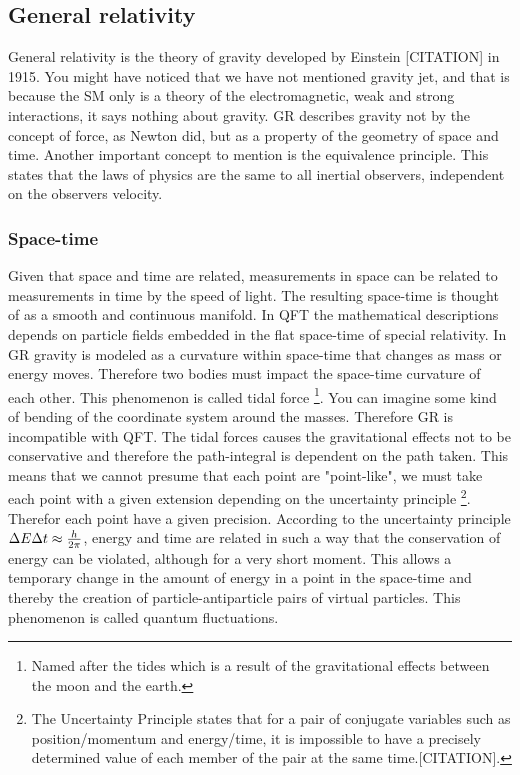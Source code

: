 \subsection{General relativity}
General relativity is the theory of gravity developed by Einstein [CITATION] in 1915. You might have noticed that we have not mentioned gravity jet, and that is because the SM only is a theory of the electromagnetic, weak and strong interactions, it says nothing about gravity. GR describes gravity not by the concept of force, as Newton did, but as a property of the geometry of space and time. Another important concept to mention is the equivalence principle. This states that the laws of physics are the same to all inertial observers, independent on the observers velocity.

\subsubsection{Space-time}
Given that space and time are related, measurements in space can be related to measurements in time by the speed of light. The resulting space-time is thought of as a smooth and continuous manifold. In QFT the mathematical descriptions depends on particle fields embedded in the flat space-time of special relativity. In GR gravity is modeled as a curvature within space-time that changes as mass or energy moves. Therefore two bodies must impact the space-time curvature of each other. This phenomenon is called tidal force \footnote{Named after the tides which is a result of the gravitational effects between the moon and the earth.}. You can imagine some kind of bending of the coordinate system around the masses. Therefore GR is incompatible with QFT. The tidal forces causes the gravitational effects not to be conservative and therefore the path-integral is dependent on the path taken. This means that we cannot presume that each point are "point-like", we must take each point with a given extension depending on the uncertainty principle \footnote{The Uncertainty Principle states that for a pair of conjugate variables such as position/momentum and energy/time, it is impossible to have a precisely determined value of each member of the pair at the same time.[CITATION].}. Therefor each point have a given precision. According to the uncertainty principle $\Delta E \Delta t \approx {h \over 2 \pi}$, energy and time are related in such a way that the conservation of energy can be violated, although for a very short moment. This allows a temporary change in the amount of energy in a point in the space-time and thereby the creation of particle-antiparticle pairs of virtual particles. This phenomenon is called quantum fluctuations.

